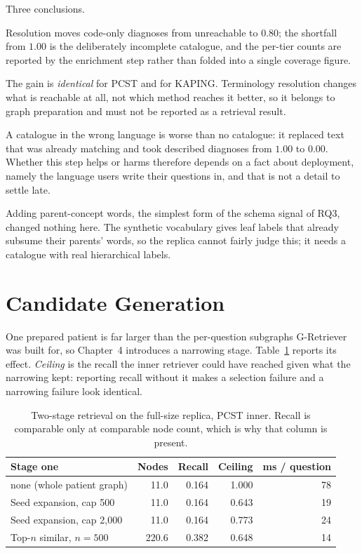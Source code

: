 Three conclusions.

Resolution moves code-only diagnoses from unreachable to $0.80$; the shortfall
from $1.00$ is the deliberately incomplete catalogue, and the per-tier counts are
reported by the enrichment step rather than folded into a single coverage
figure.

The gain is \emph{identical} for PCST and for KAPING. Terminology resolution
changes what is reachable at all, not which method reaches it better, so it
belongs to graph preparation and must not be reported as a retrieval result.

A catalogue in the wrong language is worse than no catalogue: it replaced text
that was already matching and took described diagnoses from $1.00$ to $0.00$.
Whether this step helps or harms therefore depends on a fact about deployment,
namely the language users write their questions in, and that is not a detail to
settle late.

Adding parent-concept words, the simplest form of the schema signal of RQ3,
changed nothing here. The synthetic vocabulary gives leaf labels that already
subsume their parents' words, so the replica cannot fairly judge this; it needs a
catalogue with real hierarchical labels.

\section{Candidate Generation} \label{sec:results-candidates}

One prepared patient is far larger than the per-question subgraphs G-Retriever
was built for, so Chapter~4 introduces a narrowing stage.
Table~\ref{tab:candidates} reports its effect. \emph{Ceiling} is the recall the
inner retriever could have reached given what the narrowing kept: reporting
recall without it makes a selection failure and a narrowing failure look
identical.

\begin{table}[t]
\centering
\caption{Two-stage retrieval on the full-size replica, PCST inner. Recall is
comparable only at comparable node count, which is why that column is present.}
\label{tab:candidates}
\begin{tabular}{lrrrr}
\toprule
Stage one & Nodes & Recall & Ceiling & ms / question \\
\midrule
none (whole patient graph)  & 11.0  & 0.164 & 1.000 & 78 \\
Seed expansion, cap 500     & 11.0  & 0.164 & 0.643 & 19 \\
Seed expansion, cap 2{,}000 & 11.0  & 0.164 & 0.773 & 24 \\
Top-$n$ similar, $n = 500$  & 220.6 & 0.382 & 0.648 & 14 \\
\bottomrule
\end{tabular}
\end{table}

